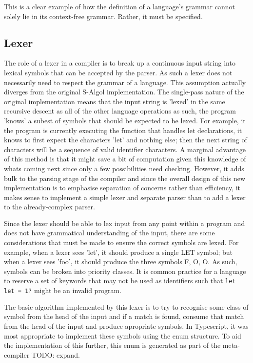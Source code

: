\documentclass{article}
\begin{document}
This is a clear example of how the definition of a language's grammar cannot solely lie in its context-free grammar. Rather, it must be specified.

\subsection{Lexer}

The role of a lexer in a compiler is to break up a continuous input string into lexical symbols that can be accepted by the parser. As such a lexer does not necessarily need to respect the grammar of a language. This assumption actually diverges from the original S-Algol implementation. The single-pass nature of the original implementation means that the input string is 'lexed' in the same recursive descent as all of the other language operations as such, the program 'knows' a subest of symbols that should be expected to be lexed. For example, it the program is currently executing the function that handles let declarations, it knows to first expect the characters 'let' and nothing else; then the next string of characters will be a sequence of valid identifier characters. A marginal advantage of this method is that it might save a bit of computation given this knowledge of whats coming next since only a few possibilities need checking. However, it adds bulk to the parsing stage of the compiler and since the overall design of this new implementation is to emphasise separation of concerns rather than efficiency, it makes sense to implement a simple lexer and separate parser than to add a lexer to the already-complex parser.

Since the lexer should be able to lex input from any point within a program and does not have grammatical understanding of the input, there are some considerations that must be made to ensure the correct symbols are lexed. For example, when a lexer sees 'let', it should produce a single LET symbol; but when a lexer sees 'foo', it should produce the three symbols F, O, O. As such, symbols can be broken into priority classes. It is common practice for a language to reserve a set of keywords that may not be used as identifiers such that \lstinline{let let = 1?} might be an invalid program.

The basic algorithm implemented by this lexer is to try to recognise some class of symbol from the head of the input and if a match is found, consume that match from the head of the input and produce apropriate symbols. In Typescript, it was most appropriate to implement these symbols using the enum structure. To aid the implementation of this further, this enum is generated as part of the meta-compiler TODO: expand.
\end{document}
